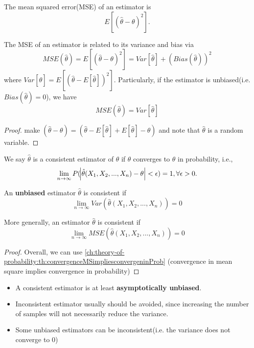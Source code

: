\begin{refsection}
\begin{definition}
The mean squared error(MSE) of an estimator is $$E[(\hat{\theta}-\theta)^2].$$
\end{definition}

\begin{theorem}
The MSE of an estimator is related to its variance and bias via
\begin{equation}
 MSE(\hat{\theta}) = E[(\hat{\theta}-\theta)^2]=Var[\hat{\theta}] + (Bias(\hat{\theta}))^2
\end{equation}
where $Var[\hat{\theta}] = E[(\hat{\theta} - E[\hat{\theta}])^2]$. Particularly, if the estimator is unbiased(i.e. $Bias(\hat{\theta}) = 0$), we have
$$MSE(\hat{\theta}) =Var[\hat{\theta}]$$
\end{theorem}
\begin{proof}
make $(\hat{\theta}-\theta) = (\hat{\theta}-E[\hat{\theta}] + E[\hat{\theta}] - \theta)$ and note that $\hat{\theta}$ is a random variable.	
\end{proof}
 

\begin{definition}
We say $\hat{\theta}$ is a consistent estimator of $\theta$ if $\hat{\theta}$ converges to $\theta$ in probability, i.e., 
$$\lim_{n\to \infty} P(\abs{\hat{\theta}(X_1,X_2,...,X_n)-\theta} < \epsilon) = 1,\forall \epsilon > 0.$$
\end{definition}

\begin{theorem}
An \textbf{unbiased} estimator $\hat{\theta}$ is consistent if $$\lim_{n\to \infty} Var(\hat{\theta}(X_1,X_2,...,X_n)) = 0$$

More generally, an estimator $\hat{\theta}$ is consistent if $$\lim_{n\to \infty} MSE(\hat{\theta}(X_1,X_2,...,X_n)) = 0$$

\end{theorem}
\begin{proof}
Overall, we can use \autoref{ch:theory-of-probability:th:convergenceMSimpliesconvergeninProb} (convergence in mean square implies convergence in probability)

\end{proof}
 
\begin{remark}\hfill
	\begin{itemize}
		\item A consistent estimator is at least \textbf{asymptotically unbiased}.
		\item Inconsistent estimator usually should be avoided, since increasing the number of samples will not necessarily reduce the variance.
		\item Some unbiased estimators can be inconsistent(i.e. the variance does not converge to 0)
	\end{itemize}
\end{remark}



\end{refsection}
